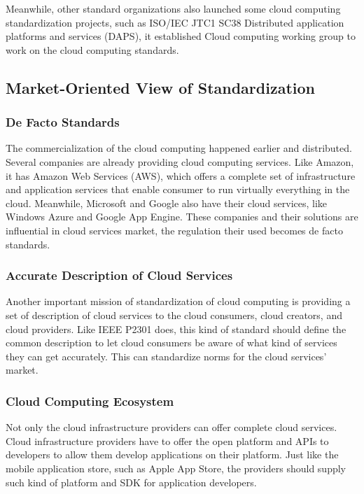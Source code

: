 \documentclass[conference]{IEEEtran}
\begin{document}
Meanwhile, other standard organizations also launched some cloud computing standardization projects, such as ISO/IEC JTC1 SC38 Distributed application platforms and services (DAPS), it established Cloud computing working group to work on the cloud computing standards.


\subsection{Market-Oriented View of Standardization}
\subsubsection{De Facto Standards}
The commercialization of the cloud computing happened earlier and distributed. Several companies are already providing cloud computing services. Like Amazon, it has Amazon Web Services (AWS), which offers a complete set of infrastructure and application services that enable consumer to run virtually everything in the cloud.\cite{AWS} Meanwhile, Microsoft and Google also have their cloud services, like Windows Azure and Google App Engine.\cite{WA} \cite{GAE} These companies and their solutions are influential in cloud services market, the regulation their used becomes de facto standards.

\subsubsection{Accurate Description of Cloud Services}
Another important mission of standardization of cloud computing is providing a set of description of cloud services to the cloud consumers, cloud creators, and cloud providers. Like IEEE P2301 does, this kind of standard should define the common description to let cloud consumers be aware of what kind of services they can get accurately. This can standardize norms for the cloud services' market.

\subsubsection{Cloud Computing Ecosystem}
Not only the cloud infrastructure providers can offer complete cloud services. Cloud infrastructure providers have to offer the open platform and APIs to developers to allow them develop applications on their platform. Just like the mobile application store, such as Apple App Store, the providers should supply such kind of platform and SDK for application developers.
\end{document}
